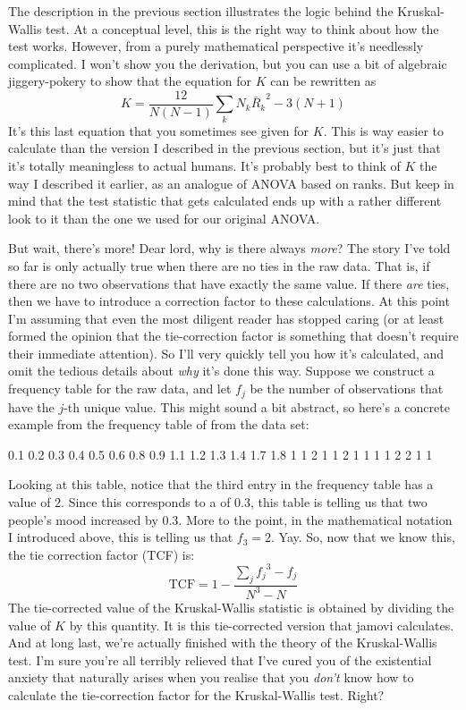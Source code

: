 \begin{mdframed}[style=MyFrame,nobreak=false]
The description in the previous section illustrates the logic behind the Kruskal-Wallis test. At a conceptual level, this is the right way to think about how the test works. However, from a purely mathematical perspective it's needlessly complicated. I won't show you the derivation, but you can use a bit of algebraic jiggery-pokery to show that the equation for $K$ can be rewritten as 
$$
K = \frac{12}{N(N-1)} \sum_k N_k {\bar{R}_k}^2    -  3(N+1)
$$
It's this last equation that you sometimes see given for $K$. This is way easier to calculate than the version I described in the previous section, but it's just that it's totally meaningless to actual humans. It's probably best to think of $K$ the way I described it earlier, as an analogue of ANOVA based on ranks. But keep in mind that the test statistic that gets calculated ends up with a rather different look to it than the one we used for our original ANOVA.

But wait, there's more! Dear lord, why is there always {\it more}? The story I've told so far is only actually true when there are no ties in the raw data. That is, if there are no two observations that have exactly the same value. If there {\it are} ties, then we have to introduce a correction factor to these calculations. At this point I'm assuming that even the most diligent reader has stopped caring (or at least formed the opinion that the tie-correction factor is something that doesn't require their immediate attention). So I'll very quickly tell you how it's calculated, and omit the tedious details about {\it why} it's done this way. Suppose we construct a frequency table for the raw data, and let $f_j$ be the number of observations that have the $j$-th unique value. This might sound a bit abstract, so here's a concrete example from the frequency table of  from the  data set:
\begin{rblock1}
0.1 0.2 0.3 0.4 0.5 0.6 0.8 0.9 1.1 1.2 1.3 1.4 1.7 1.8 
  1   1   2   1   1   2   1   1   1   1   2   2   1   1 
\end{rblock1}
Looking at this table, notice that the third entry in the frequency table has a value of $2$. Since this corresponds to a  of 0.3, this table is telling us that two people's mood increased by 0.3. More to the point, in the mathematical notation I introduced above, this is telling us that $f_3 = 2$. Yay. So, now that we know this, the tie correction factor (TCF) is:
$$
\mbox{TCF} = 1 - \frac{\sum_j {f_j}^3 - f_j}{N^3 - N} 
$$
The tie-corrected value of the Kruskal-Wallis statistic is obtained by dividing the value of $K$ by this quantity. It is this tie-corrected version that jamovi calculates. And at long last, we're actually finished with the theory of the Kruskal-Wallis test. I'm sure you're all terribly relieved that I've cured you of the existential anxiety that naturally arises when you realise that you {\it don't} know how to calculate the tie-correction factor for the Kruskal-Wallis test. Right?
\end{mdframed}


